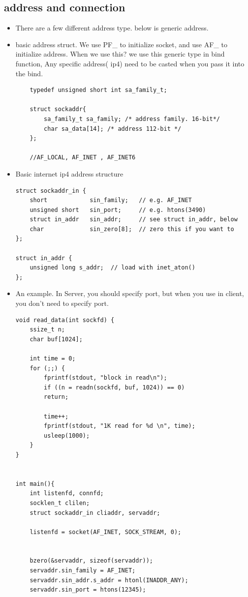 \documentclass[a4paper,11pt,twoside]{book}
\begin{document}
\subsection{address and connection}
\begin{itemize}
	\item There are a few different address type. below is generic address.
	\item basic address struct. We use PF\_ to initialize socket, and use AF\_ to initialize  address. When we use this? we use this generic type in bind function, Any specific address( ip4) need to be casted when you pass it into the bind.  
\begin{lstlisting}
	typedef unsigned short int sa_family_t;
	
	struct sockaddr{
		sa_family_t sa_family; /* address family. 16-bit*/
		char sa_data[14]; /* address 112-bit */
	};
	
	//AF_LOCAL, AF_INET , AF_INET6
\end{lstlisting}

	\item Basic internet ip4 address structure
\begin{lstlisting}
struct sockaddr_in {
	short            sin_family;   // e.g. AF_INET
	unsigned short   sin_port;     // e.g. htons(3490)
	struct in_addr   sin_addr;     // see struct in_addr, below
	char             sin_zero[8];  // zero this if you want to
};

struct in_addr {
	unsigned long s_addr;  // load with inet_aton()
};
\end{lstlisting}	
	
	\item An example. In Server, you should specify port, but when you use in client, you don't need to specify port.
\begin{lstlisting}
void read_data(int sockfd) {
	ssize_t n;
	char buf[1024];
	
	int time = 0;
	for (;;) {
		fprintf(stdout, "block in read\n");
		if ((n = readn(sockfd, buf, 1024)) == 0)
		return;
		
		time++;
		fprintf(stdout, "1K read for %d \n", time);
		usleep(1000);
	}
}

	
int main(){	
	int listenfd, connfd;
	socklen_t clilen;
	struct sockaddr_in cliaddr, servaddr;
	
	listenfd = socket(AF_INET, SOCK_STREAM, 0);
	
	
	bzero(&servaddr, sizeof(servaddr));
	servaddr.sin_family = AF_INET;
	servaddr.sin_addr.s_addr = htonl(INADDR_ANY);
	servaddr.sin_port = htons(12345);
	

\end{lstlisting}
\end{itemize}
\end{document}
